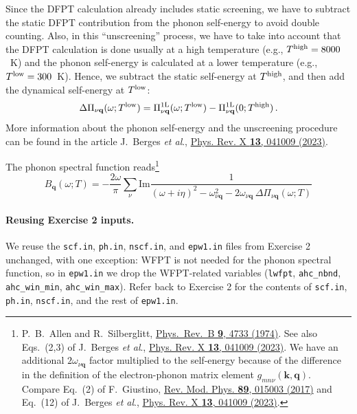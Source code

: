 \documentclass[a4paper,11pt,serif]{article}
\newcommand{\mb}[1]{\mathbf{#1}}
\newcommand{\nuq}[0]{{\nu\mb{q}}}
\begin{document}
Since the DFPT calculation already includes static screening, we have to subtract the static DFPT contribution from the phonon self-energy to avoid double counting.
Also, in this ``unscreening'' process, we have to take into account that the DFPT calculation is done usually at a high temperature (e.g., $T^{\rm high} = 8000$~K) and the phonon self-energy is calculated at a lower temperature (e.g., $T^{\rm low} = 300$~K).
Hence, we subtract the static self-energy at $T^{\rm high}$, and then add the dynamical self-energy at $T^{\rm low}$:
\begin{equation} \label{eq:phself_unscreening}
   \Delta \Pi_\nuq(\omega; T^{\rm low}) = \Pi^{\rm 1L}_\nuq(\omega; T^{\rm low}) - \Pi^{\rm 1L}_\nuq(0; T^{\rm high}) \,.
\end{equation}
More information about the phonon self-energy and the unscreening procedure can be found in the article J.\ Berges \textit{et al}., \href{https://journals.aps.org/prx/abstract/10.1103/PhysRevX.13.041009}{Phys. Rev. X \textbf{13}, 041009 (2023)}.

\vspace{0.2cm}

The phonon spectral function reads\footnote{P.\ B.\ Allen and R.\ Silberglitt, \href{https://journals.aps.org/prb/abstract/10.1103/PhysRevB.9.4733}{Phys.\ Rev.\ B \textbf{9}, 4733 (1974)}. See also Eqs.~(2,3) of J.\ Berges \textit{et al}., \href{https://journals.aps.org/prx/abstract/10.1103/PhysRevX.13.041009}{Phys. Rev. X \textbf{13}, 041009 (2023)}. We have an additional $2\omega_\nuq$ factor multiplied to the self-energy because of the difference in the definition of the electron-phonon matrix element $g_{mn\nu}(\mb{k}, \mb{q})$. Compare Eq.~(2) of F.\ Giustino, \href{https://journals.aps.org/rmp/abstract/10.1103/RevModPhys.89.015003}{Rev. Mod. Phys. \textbf{89}, 015003 (2017)} and Eq.~(12) of J.\ Berges \textit{et al}., \href{https://journals.aps.org/prx/abstract/10.1103/PhysRevX.13.041009}{Phys. Rev. X \textbf{13}, 041009 (2023)}.}
\begin{equation} \label{eq:phspec}
   B_{\mb{q}}(\omega; T) = -\frac{2\omega}{\pi} \sum_{\nu} \mathrm{Im} \frac{1}{(\omega + i\eta)^2 - \omega_\nuq^2 - 2\omega_\nuq \, \Delta \Pi_\nuq(\omega; T)}
\end{equation}

\vspace{0.2cm}

\paragraph{Reusing Exercise 2 inputs.}
We reuse the \texttt{scf.in}, \texttt{ph.in}, \texttt{nscf.in}, and \texttt{epw1.in} files from Exercise 2 unchanged, with one exception: WFPT is not needed for the phonon spectral function, so in \texttt{epw1.in} we drop the WFPT-related variables
(\texttt{lwfpt}, \texttt{ahc\_nbnd}, \texttt{ahc\_win\_min}, \texttt{ahc\_win\_max}).
Refer back to Exercise 2 for the contents of \texttt{scf.in}, \texttt{ph.in}, \texttt{nscf.in}, and the rest of \texttt{epw1.in}.
\end{document}
